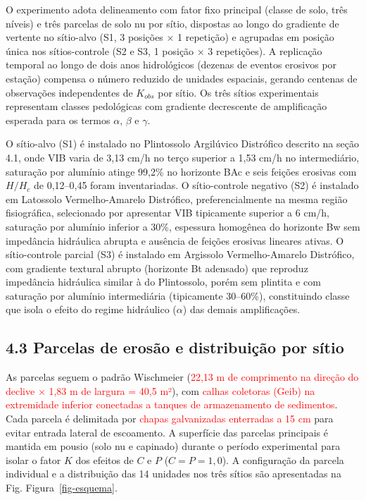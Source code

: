 \documentclass[
  brazilian,
  authoryear,
  preprint]{elsarticle}
\begin{document}
O experimento adota delineamento com fator fixo principal (classe de
solo, três níveis) e três parcelas de solo nu por sítio, dispostas ao
longo do gradiente de vertente no sítio-alvo (S1, 3 posições × 1
repetição) e agrupadas em posição única nos sítios-controle (S2 e S3, 1
posição × 3 repetições). A replicação temporal ao longo de dois anos
hidrológicos (dezenas de eventos erosivos por estação) compensa o número
reduzido de unidades espaciais, gerando centenas de observações
independentes de \(K_{obs}\) por sítio. Os três sítios experimentais
representam classes pedológicas com gradiente decrescente de
amplificação esperada para os termos \(\alpha\), \(\beta\) e \(\gamma\).

O sítio-alvo (S1) é instalado no Plintossolo Argilúvico Distrófico
descrito na seção 4.1, onde VIB varia de 3,13 cm/h no terço superior a
1,53 cm/h no intermediário, saturação por alumínio atinge 99,2\% no
horizonte BAc e seis feições erosivas com \(H/H_c\) de 0,12--0,45 foram
inventariadas. O sítio-controle negativo (S2) é instalado em Latossolo
Vermelho-Amarelo Distrófico, preferencialmente na mesma região
fisiográfica, selecionado por apresentar VIB tipicamente superior a 6
cm/h, saturação por alumínio inferior a 30\%, espessura homogênea do
horizonte Bw sem impedância hidráulica abrupta e ausência de feições
erosivas lineares ativas. O sítio-controle parcial (S3) é instalado em
Argissolo Vermelho-Amarelo Distrófico, com gradiente textural abrupto
(horizonte Bt adensado) que reproduz impedância hidráulica similar à do
Plintossolo, porém sem plintita e com saturação por alumínio
intermediária (tipicamente 30--60\%), constituindo classe que isola o
efeito do regime hidráulico (\(\alpha\)) das demais amplificações.

\subsection{4.3 Parcelas de erosão e distribuição por
sítio}\label{parcelas-de-erosuxe3o-e-distribuiuxe7uxe3o-por-suxedtio}

As parcelas seguem o padrão Wischmeier (\textcolor{red}{22,13 m de
comprimento na direção do declive × 1,83 m de largura = 40,5 m²}), com
\textcolor{red}{calhas coletoras (Geib) na extremidade inferior
conectadas a tanques de armazenamento de sedimentos}. Cada parcela é
delimitada por \textcolor{red}{chapas galvanizadas enterradas a 15 cm}
para evitar entrada lateral de escoamento. A superfície das parcelas
principais é mantida em pousio (solo nu e capinado) durante o período
experimental para isolar o fator \(K\) dos efeitos de \(C\) e \(P\)
(\(C = P = 1{,}0\)). A configuração da parcela individual e a
distribuição das 14 unidades nos três sítios são apresentadas na Fig.
Figura~\ref{fig-esquema}.
\end{document}

